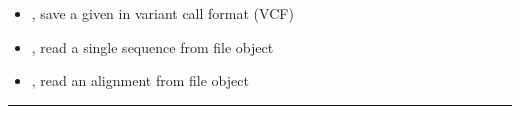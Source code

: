 \documentclass[letterpaper,10pt,english]{sphinxmanual}
\begin{document}
\begin{description}
\begin{itemize}
\item {} 
{\hyperref[fasta:libPoMo.fasta.save_as_vcf]{}}, save a given {\hyperref[fasta:libPoMo.fasta.FaSeq]{}} in variant call
format (VCF)

\item {} 
{\hyperref[fasta:libPoMo.fasta.read_seq_from_fo]{}}, read a single sequence from file object

\item {} 
{\hyperref[fasta:libPoMo.fasta.read_align_from_fo]{}}, read an alignment from file object

\end{itemize}

\end{description}


\bigskip\hrule{}\bigskip

\end{document}
